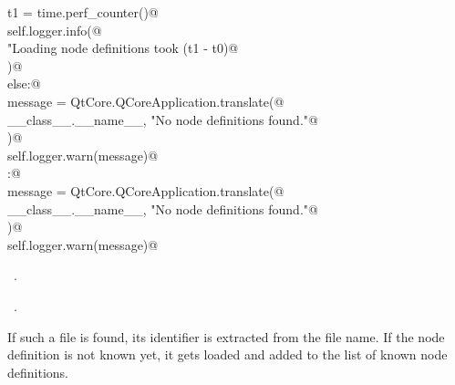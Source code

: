 \documentclass[
    a4paper,      %
    10pt,         %
    openright,    %
    notitlepage,  %
    parskip=half, %
]{scrreprt}       %
\theoremstyle{definition}                    %
\begin{document}
\begin{flushleft}
\begin{minipage}{\linewidth}
\begin{list}{}{}
\mbox{}\lstinline@        t1 = time.perf_counter()@\\
\mbox{}\lstinline@        self.logger.info(@\\
\mbox{}\lstinline@            "Loading node definitions took %.10f seconds",@\\
\mbox{}\lstinline@            (t1 - t0)@\\
\mbox{}\lstinline@        )@\\
\mbox{}\lstinline@    else:@\\
\mbox{}\lstinline@        message = QtCore.QCoreApplication.translate(@\\
\mbox{}\lstinline@            __class__.__name__, "No node definitions found."@\\
\mbox{}\lstinline@        )@\\
\mbox{}\lstinline@        self.logger.warn(message)@\\
\mbox{}\lstinline@else:@\\
\mbox{}\lstinline@    message = QtCore.QCoreApplication.translate(@\\
\mbox{}\lstinline@        __class__.__name__, "No node definitions found."@\\
\mbox{}\lstinline@    )@\\
\mbox{}\lstinline@    self.logger.warn(message)@\\
\mbox{}\lstinline@@{\NWsep}
\end{list}
\vspace{-1.5ex}
\footnotesize
\begin{list}{}{\setlength{\itemsep}{-\parsep}\setlength{\itemindent}{-\leftmargin}}
\item \NWtxtMacroDefBy\ .
\item \NWtxtMacroRefIn\ .

\item{}
\end{list}
\end{minipage}\vspace{4ex}
\end{flushleft}
If such a file is found, its identifier is extracted from the file name. If the
node definition is not known yet, it gets loaded and added to the list of known
node definitions.
\end{document}
